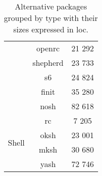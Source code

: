 \begin{table}[!ht]
\begin{tabular}{|c|c|c|}
        \cline{2-3}
        & openrc \cite{openrc} & 21 292 \\
        \cline{2-3}
        & shepherd \cite{shepherd} & 23 733 \\ %
        \cline{2-3}
        & s6 \cite{s6} & 24 824 \\
        \cline{2-3}
        & finit \cite{finit} & 35 280 \\
        \cline{2-3}
        & nosh \cite{nosh} & 82 618 \\ %
        \hline
        \hline
        \multirow{4}{*}{Shell}
        & rc \cite{rc} & 7 205 \\
        \cline{2-3}
        & oksh \cite{oksh} & 23 001 \\
        \cline{2-3}
        & mksh \cite{mksh} & 30 680 \\
        \cline{2-3}
        & yash \cite{yash} & 72 746 \\
        \hline
    \end{tabular}
    \caption{Alternative packages grouped by type with their sizes expressed in \gls{loc}.}
\end{table}


\newpage

